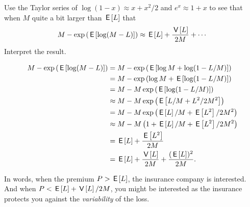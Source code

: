 \documentclass[lectures]{subfiles}
\begin{document}
\begin{exercise}
Use the Taylor series of $\log (1-x) \approx x + x^{2}/2$ and $e^{x} \approx 1+x $  to see that when $M$ quite a bit larger than $\,\mathsf{E}\left[L\right]$ that
\begin{equation}
  \label{eq:7}
M - \exp\left(\,\mathsf{E}\left[\log (M-L)\right]\right) \approx \,\mathsf{E}\left[L\right] + \frac{\,\mathsf{V}\left[L\right]}{2 M} + \cdots
\end{equation}
Interpret the result.
\begin{solution}
  \begin{align}
M - \exp\left(\,\mathsf{E}\left[\log (M-L)\right]\right)
&=  M - \exp\left(\,\mathsf{E}\left[\log M + \log (1-L/M)\right]\right)  \\
&=  M - \exp\left(\log M + \,\mathsf{E}\left[\log (1-L/M)\right]\right)  \\
&=  M - M \exp\left(\,\mathsf{E}\left[\log (1-L/M)\right]\right)  \\
&\approx  M - M \exp\left(\,\mathsf{E}\left[ L/M + L^{2}/2M^{2}\right]\right)  \\
&=  M - M \exp\left(\,\mathsf{E}\left[L\right]/M + \,\mathsf{E}\left[L^{2}\right]/2M^{2}\right)  \\
&\approx  M - M \left(1+ \,\mathsf{E}\left[L\right]/M + \,\mathsf{E}\left[L^{2}\right]/2M^{2}\right)  \\
&= \,\mathsf{E}\left[L\right]  + \frac{\,\mathsf{E}\left[L^{2}\right]}{2M} \\
&= \,\mathsf{E}\left[L\right] + \frac{\,\mathsf{V}\left[L\right]}{2M} + \frac{(\,\mathsf{E}\left[L\right])^{2}}{2M}.
  \end{align}

  In words, when the premium $P>\,\mathsf{E}\left[L\right]$, the insurance company is interested.
  And when $P< \,\mathsf{E}\left[L\right] + \,\mathsf{V}\left[L\right]/2M$, you might be interested as the insurance protects you against the \emph{variability} of the loss.

\end{solution}
\end{exercise}
\end{document}

